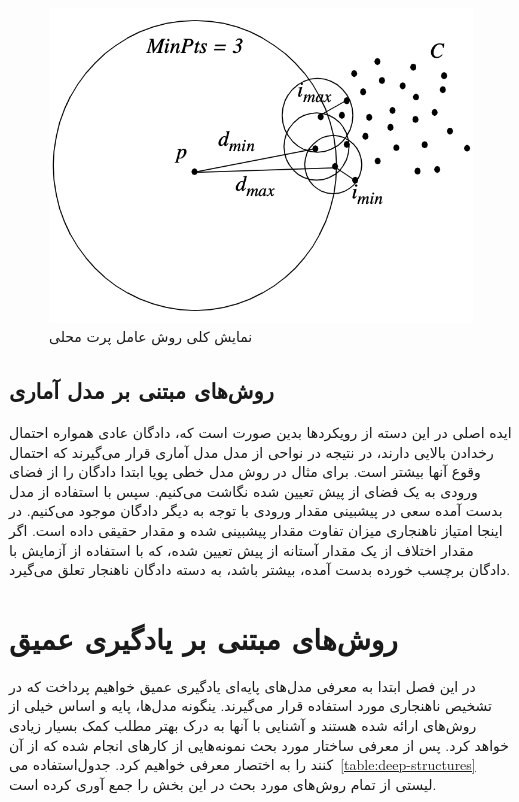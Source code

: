 \documentclass[12pt,a4paper]{report}
\theoremstyle{definition}
\theoremstyle{definition}
\begin{document}
	\begin{figure}[!h]
	\begin{center}
		\includegraphics[width=0.5\linewidth]{./images/figures/lof.png}
	\end{center}
	\caption{نمایش کلی روش عامل پرت محلی~\cite{10.1145/342009.335388}}
	\label{fig:lof}
	\centering
\end{figure}



\section{روش‌های مبتنی بر مدل آماری}
ایده اصلی در این دسته از رویکرد‌ها بدین صورت است که، دادگان عادی همواره احتمال رخدادن بالایی دارند، در نتیجه در نواحی از مدل مدل آماری قرار می‌گیرند که احتمال وقوع آنها بیشتر است. برای مثال در روش مدل خطی پویا ابتدا دادگان را از فضای ورودی به یک فضای از پیش تعیین شده نگاشت می‌کنیم. سپس با استفاده از مدل بدست آمده سعی در پیشبینی مقدار ورودی با توجه به دیگر دادگان موجود می‌کنیم. در اینجا امتیاز ناهنجاری میزان تفاوت مقدار پیشبینی شده و مقدار حقیقی داده است. اگر مقدار اختلاف از یک مقدار آستانه از پیش تعیین شده، که با استفاده از آزمایش با دادگان برچسب خورده بدست آمده، بیشتر باشد، به دسته دادگان ناهنجار تعلق می‌گیرد.


	\chapter{روش‌های مبتنی بر یادگیری عمیق}
	در این فصل‌ ابتدا به معرفی مدل‌های پایه‌ای یادگیری عمیق خواهیم پرداخت که در تشخیص ناهنجاری مورد استفاده قرار می‌گیرند. ینگونه مدل‌ها، پایه و اساس خیلی از روش‌های ارائه شده هستند و آشنایی با آنها به درک بهتر مطلب کمک بسیار زیادی خواهد کرد. پس از معرفی ساختار مورد بحث نمونه‌هایی از کار‌های انجام شده که از آن استفاده می‌‎کنند را به اختصار معرفی خواهیم کرد. جدول~\ref{table:deep-structures} لیستی از تمام روش‌های مورد بحث در این بخش را جمع آوری کرده است.
\end{document}
